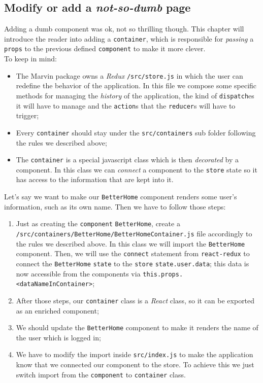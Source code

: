 \subsection{Modify or add a \emph{not-so-dumb} page}
Adding a dumb component was ok, not so thrilling though. This chapter will introduce the reader into adding a \verb|container|, which is responsible for \emph{passing} a \verb|props| to the previous defined \verb|component| to make it more clever.
\\To keep in mind:
\begin{itemize}
	\item The Marvin package owns a \emph{Redux} \verb|/src/store.js| in which the user can redefine the behavior of the application. In this file we compose some specific methods for managing the \emph{history} of the application, the kind of \verb|dispatch|es it will have to manage and the \verb|action|s that the \verb|reducer|s will have to trigger;
	\item Every \verb|container| should stay under the \verb|src/containers| sub folder following the rules we described above;
	\item The \verb|container| is a special javascript class which is then \emph{decorated} by a component. In this class we can \emph{connect} a component to the \verb|store| state so it has access to the information that are kept into it.
\end{itemize} 
Let's say we want to make our \verb|BetterHome| component renders some user's information, such as its own name. Then we have to follow those steps:
\begin{enumerate}
	\item Just as creating the \verb|component| \verb|BetterHome|, create a \verb|/src/containers/BetterHome/BetterHomeContainer.js| file accordingly to the rules we described above. In this class we will import the \verb|BetterHome| component. Then, we will use the \verb|connect| statement from \verb|react-redux| to connect the \verb|BetterHome| \verb|state| to the \verb|store| \verb|state.user.data|; this data is now accessible from the components via \verb|this.props.<dataNameInContainer>|;
	\item After those steps, our \verb|container| class is a \emph{React} class, so it can be exported as an enriched component;
	\item We should update the \verb|BetterHome| component to make it renders the name of the user which is logged in;
	\item We have to modify the import inside \verb|src/index.js| to make the application know that we connected our component to the store. To achieve this we just switch import from the \verb|component| to \verb|container| class.
\end{enumerate}
